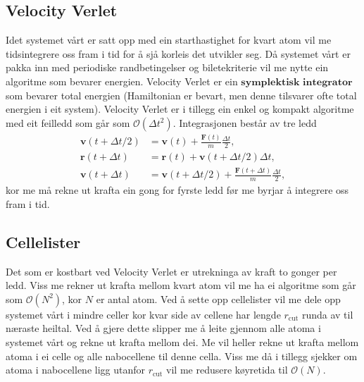 \documentclass[12pt, a4paper]{article}
\theoremstyle{definition} \newtheorem*{definition}{Teorem}
\newcommand{\vb}{\mathbf}
\begin{document}
    \subsection*{Velocity Verlet}
        Idet systemet vårt er satt opp med ein starthastighet for kvart atom vil me tidsintegrere oss fram i tid for å sjå korleis det utvikler seg. Då systemet vårt er pakka
        inn med periodiske randbetingelser og biletekriterie vil me nytte ein algoritme som bevarer energien. Velocity Verlet er ein $\textbf{symplektisk integrator}$ som 
        bevarer total energien (Hamiltonian er bevart, men denne tilsvarer ofte total energien i eit system). Velocity Verlet er i tillegg ein enkel og kompakt algoritme med
        eit feilledd som går som $\mathcal{O}(\Delta t^2)$. Integrasjonen består av tre ledd
        \begin{align*}
            \vb{v}(t + \Delta t/2) &= \vb{v}(t) + \frac{\vb{F}(t)}{m}\frac{\Delta t}{2}, \\
            \vb{r}(t + \Delta t) &= \vb{r}(t) + \vb{v}(t + \Delta t/2)\Delta t, \\
            \vb{v}(t + \Delta t) &= \vb{v}(t + \Delta t/2) + \frac{\vb{F}(t + \Delta t)}{m}\frac{\Delta t}{2},
        \end{align*}
        kor me må rekne ut krafta ein gong for fyrste ledd før me byrjar å integrere oss fram i tid.

    \subsection*{Cellelister}
        Det som er kostbart ved Velocity Verlet er utrekninga av kraft to gonger per ledd. Viss me rekner ut krafta mellom kvart atom vil me ha ei algoritme som går som
        $\mathcal{O}(N^2)$, kor $N$ er antal atom. Ved å sette opp cellelister vil me dele opp systemet vårt i mindre celler kor kvar side av cellene har lengde 
        $r_{\text{cut}}$ runda av til næraste heiltal. Ved å gjere dette slipper me å leite gjennom alle atoma i systemet vårt og rekne ut krafta mellom dei. Me vil 
        heller rekne ut krafta mellom atoma i ei celle og alle nabocellene til denne cella. Viss me då i tillegg sjekker om atoma i nabocellene ligg utanfor
        $r_{\text{cut}}$ vil me redusere køyretida til $\mathcal{O}(N)$.
\end{document}
